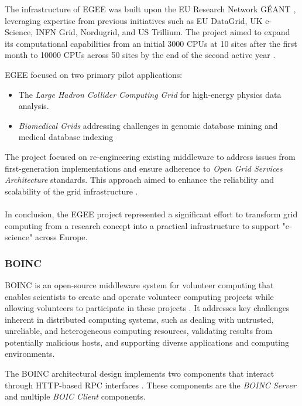 The infrastructure of \ac{EGEE} was built upon the EU Research Network GÉANT \cite{background:geant}, leveraging expertise from previous initiatives such as EU DataGrid, UK e-Science, INFN Grid, Nordugrid, and US Trillium. The project aimed to expand its computational capabilities from an initial 3000 \acs{CPU}s at 10 sites after the first month to 10000 \acs{CPU}s across 50 sites by the end of the second active year \cite{relatedwork:egee}.

\ac{EGEE} focused on two primary pilot applications: 
\begin{itemize}
  \item The \emph{Large Hadron Collider Computing Grid} for high-energy physics data analysis.
  \item \emph{Biomedical Grids} addressing challenges in genomic database mining and medical database indexing
\end{itemize}
The project focused on re-engineering existing middleware to address issues from first-generation implementations and ensure adherence to \emph{Open Grid Services Architecture} standards. This approach aimed to enhance the reliability and scalability of the grid infrastructure \cite{relatedwork:egee}.
\\~\\
In conclusion, the \ac{EGEE} project represented a significant effort to transform grid computing from a research concept into a practical infrastructure to support "e-science" across Europe.

\subsubsection{BOINC}
\label{subsec:background:related_work:boinc}
\ac{BOINC} is an open-source middleware system for volunteer computing that enables scientists to create and operate volunteer computing projects while allowing volunteers to participate in these projects \cite{relatedwork:boinc1}. It addresses key challenges inherent in distributed computing systems, such as dealing with untrusted, unreliable, and heterogeneous computing resources, validating results from potentially malicious hosts, and supporting diverse applications and computing environments.

The \ac{BOINC} architectural design implements two components that interact through \acs{HTTP}-based \ac{RPC} interfaces \cite{relatedwork:boinc1}. These components are the \emph{\ac{BOINC} Server} and multiple \emph{\ac{BOIC} Client} components.

